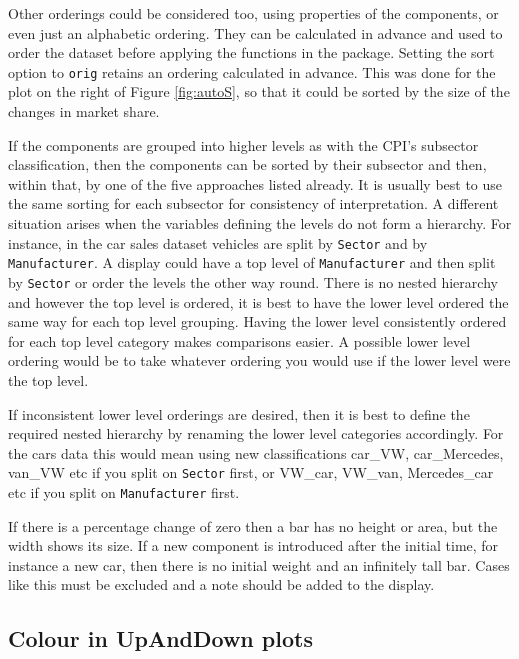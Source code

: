 Other orderings could be considered too, using properties of the components, or even just an alphabetic ordering. They can be calculated in advance and used to order the dataset before applying the functions in the package. Setting the sort option to \texttt{orig} retains an ordering calculated in advance. This was done for the plot on the right of Figure \ref{fig:autoS}, so that it could be sorted by the size of the changes in market share.

If the components are grouped into higher levels as with the CPI's subsector classification, then the components can be sorted by their subsector and then, within that, by one of the five approaches listed already. It is usually best to use the same sorting for each subsector for consistency of interpretation. A different situation arises when the variables defining the levels do not form a hierarchy. For instance, in the car sales dataset vehicles are split by \texttt{Sector} and by \texttt{Manufacturer}. A display could have a top level of \texttt{Manufacturer} and then split by \texttt{Sector} or order the levels the other way round. There is no nested hierarchy and however the top level is ordered, it is best to have the lower level ordered the same way for each top level grouping. Having the lower level consistently ordered for each top level category makes comparisons easier. A possible lower level ordering would be to take whatever ordering you would use if the lower level were the top level.

If inconsistent lower level orderings are desired, then it is best to define the required nested hierarchy by renaming the lower level categories accordingly. For the cars data this would mean using new classifications car\_VW, car\_Mercedes, van\_VW etc if you split on \texttt{Sector} first, or VW\_car, VW\_van, Mercedes\_car etc if you split on \texttt{Manufacturer} first.

If there is a percentage change of zero then a bar has no height or area, but the width shows its size. If a new component is introduced after the initial time, for instance a new car, then there is no initial weight and an infinitely tall bar. Cases like this must be excluded and a note should be added to the display.

\hypertarget{colour-in-upanddown-plots}{%
\subsection{Colour in UpAndDown plots}\label{colour-in-upanddown-plots}}

